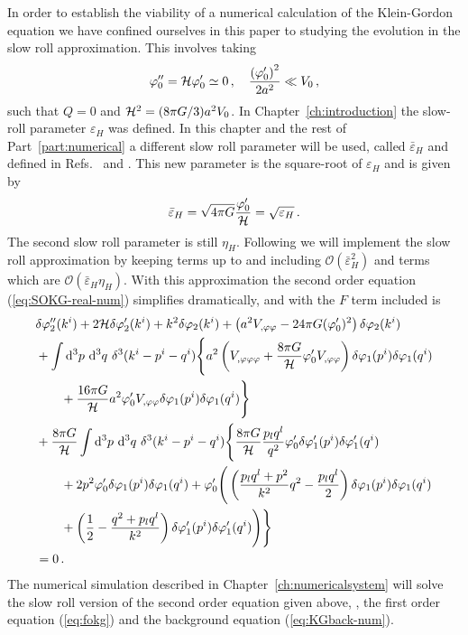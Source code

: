 In order to establish the viability of a numerical calculation of the
Klein-Gordon equation we have confined ourselves in this paper to studying the
evolution in the slow roll approximation. 
This involves taking
%
\begin{equation}
 \varphi_{0}'' = \mathcal{H} \varphi_{0}' \simeq 0\,,\quad
\frac{\left(\varphi_{0}'\right)^2}{2a^2}\ll V_{0}\,,
\end{equation}
%
such that $Q=0$ and $\mathcal{H}^2 = (8\pi G/3) a^2 V_{0}$. 
In Chapter~\ref{ch:introduction} the slow-roll parameter $\varepsilon_H$ was
defined. In this chapter and the rest of Part~\ref{part:numerical} a different slow 
roll parameter will be used, called
$\bar{\varepsilon}_H$ and defined in Refs.~\cite{Malik:2006ir} and
\cite{Seery:2005gb}. 
This new parameter is the square-root of $\varepsilon_H$ and is given by
%
\begin{equation}
 \bar{\varepsilon}_H = \sqrt{4\pi G} \frac{\varphi_{0}'}{\mathcal{H}} = \sqrt{\varepsilon_H}\,.
\end{equation}
%
The second slow roll parameter is still $\eta_H$. Following  we
will implement the slow roll approximation by keeping terms up to and including
$\mathcal{O}(\bar{\varepsilon}^2_H)$ and terms which are
$\mathcal{O}(\bar{\varepsilon}_H \eta_H)$. 
With this approximation the second order equation (\ref{eq:SOKG-real-num})
simplifies dramatically, and with the $F$ term included is
%
\begin{align}
 \label{eq:KG2-fourier-sr-num}
&\dvp2''(\kvi)+2\H\dvp2'(\kvi)+k^2\dvp2(\kvi)
+\left(a^2
\Upp-{24 \pi G}(\vp_{0}')^2\right)
\dvp2(\kvi) \nonumber\\
%
&+ \int \d^3p\ \d^3q\ \delta^3(\kvi-\pvi-\qvi) \Bigg\{
a^2\left(\Uppp
+ \frac{8\pi G}{\H}\vp_{0}' \Upp\right)
 \dvp1(\pvi)\dvp1(\qvi) \nonumber \\
%
&\qquad +\frac{16\pi G}{\H}a^2
\vp_{0}'\Upp\dvp1(\pvi)\dvp1(\qvi)\Bigg\}
\nonumber \\
%
&+ \frac{8\pi G}{\H}
\int \d^3p\ \d^3q\ \delta^3(\kvi-\pvi-\qvi)  \Bigg\{
%
\frac{8\pi G}{\H}\frac{p_l q^l}{q^2}\vp_{0}'\dvp1'(\pvi)
\dvp1'(\qvi) \nonumber\\
% 
&\qquad+ 2p^2\vp_{0}' \dvp1(\pvi) \dvp1(\qvi)
%
+\vp_{0}'
\Bigg(
\left(\frac{p_lq^l+p^2}{k^2}q^2-\frac{p_lq^l}{2}\right)
\dvp1(\pvi)\dvp1(\qvi) \nonumber \\
% 
&\qquad+\left(\frac{1}{2}-\frac{q^2+p_lq^l}{k^2}\right)
\dvp1'(\pvi)\dvp1'(\qvi)\Bigg)
\Bigg\} \nonumber \\
% 
&=0 \,.
\end{align}
%
The numerical simulation described in Chapter~\ref{ch:numericalsystem} will solve the
slow roll version of the second order equation given above,
, the first
order equation (\ref{eq:fokg}) and the background equation
(\ref{eq:KGback-num}). 
% 
% 
% 
% 

